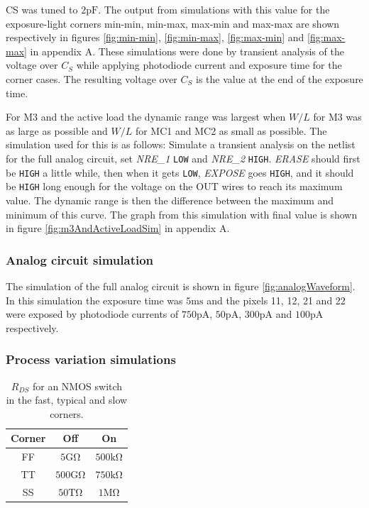 CS was tuned to $2 \mathrm{pF}$. The output from simulations with this value for the exposure-light corners min-min, min-max, max-min and max-max are shown respectively in figures \ref{fig:min-min}, \ref{fig:min-max}, \ref{fig:max-min} and \ref{fig:max-max} in appendix A. These simulations were done by transient analysis of the voltage over $C_S$ while applying photodiode current and exposure time for the corner cases. The resulting voltage over $C_S$ is the value at the end of the exposure time.

For M3 and the active load the dynamic range was largest when $W/L$ for M3 was as large as possible and $W/L$ for MC1 and MC2 as small as possible. The simulation used for this is as follows: Simulate a transient analysis on the netlist for the full analog circuit, set \emph{NRE\_1} \verb|LOW| and \emph{NRE\_2} \verb|HIGH|. \emph{ERASE} should first be \verb|HIGH| a little while, then when it gets \verb|LOW|, \emph{EXPOSE} goes \verb|HIGH|, and it should be \verb|HIGH| long enough for the voltage on the OUT wires to reach its maximum value. The dynamic range is then the difference between the maximum and minimum of this curve. The graph from this simulation with final value is shown in figure \ref{fig:m3AndActiveLoadSim} in appendix A.

\subsubsection{Analog circuit simulation}

The simulation of the full analog circuit is shown in figure \ref{fig:analogWaveform}. In this simulation the exposure time was $5 \mathrm{ms}$ and the pixels 11, 12, 21 and 22 were exposed by photodiode currents of $750 \mathrm{pA}$, $50 \mathrm{pA}$, $300 \mathrm{pA}$ and $100 \mathrm{pA}$ respectively.

\subsubsection{Process variation simulations}

\begin{table}
    \centering
    \caption{$R_{DS}$ for an NMOS switch in the fast, typical and slow corners.}
    \label{tab:corners}
    \begin{tabular}{|c|c|c|}
        \hline
        Corner & Off & On \\
        \hline
        FF & $5 \mathrm{G\Omega}$ & $500 \mathrm{k\Omega}$ \\
        TT & $500 \mathrm{G\Omega}$ & $750 \mathrm{k\Omega}$ \\
        SS & $50 \mathrm{T\Omega}$ & $1 \mathrm{M\Omega}$ \\
        \hline
    \end{tabular}
\end{table}

